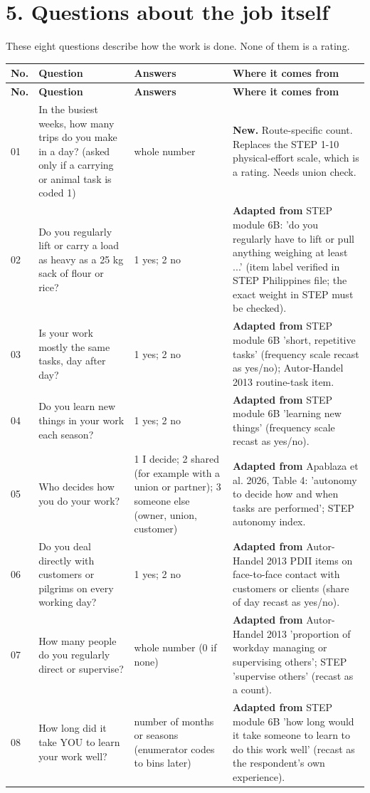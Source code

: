 \documentclass[11pt]{article}
\begin{document}
\section*{5. Questions about the job itself}
These eight questions describe how the work is done. None of them is a rating.
{\footnotesize
\begin{longtable}{p{0.7cm}p{4.5cm}p{3.0cm}p{6.4cm}}
\toprule
\textbf{No.} & \textbf{Question} & \textbf{Answers} & \textbf{Where it comes from} \\
\midrule
\endfirsthead
\toprule
\textbf{No.} & \textbf{Question} & \textbf{Answers} & \textbf{Where it comes from} \\
\midrule
\endhead
01 & In the busiest weeks, how many trips do you make in a day? (asked only if a carrying or animal task is coded 1) & whole number & \textbf{New.} Route-specific count. Replaces the STEP 1-10 physical-effort scale, which is a rating. Needs union check. \\
02 & Do you regularly lift or carry a load as heavy as a 25 kg sack of flour or rice? & 1 yes; 2 no & \textbf{Adapted from} STEP module 6B: 'do you regularly have to lift or pull anything weighing at least ...' (item label verified in STEP Philippines file; the exact weight in STEP must be checked). \\
03 & Is your work mostly the same tasks, day after day? & 1 yes; 2 no & \textbf{Adapted from} STEP module 6B 'short, repetitive tasks' (frequency scale recast as yes/no); Autor-Handel 2013 routine-task item. \\
04 & Do you learn new things in your work each season? & 1 yes; 2 no & \textbf{Adapted from} STEP module 6B 'learning new things' (frequency scale recast as yes/no). \\
05 & Who decides how you do your work? & 1 I decide; 2 shared (for example with a union or partner); 3 someone else (owner, union, customer) & \textbf{Adapted from} Apablaza et al. 2026, Table 4: 'autonomy to decide how and when tasks are performed'; STEP autonomy index. \\
06 & Do you deal directly with customers or pilgrims on every working day? & 1 yes; 2 no & \textbf{Adapted from} Autor-Handel 2013 PDII items on face-to-face contact with customers or clients (share of day recast as yes/no). \\
07 & How many people do you regularly direct or supervise? & whole number (0 if none) & \textbf{Adapted from} Autor-Handel 2013 'proportion of workday managing or supervising others'; STEP 'supervise others' (recast as a count). \\
08 & How long did it take YOU to learn your work well? & number of months or seasons (enumerator codes to bins later) & \textbf{Adapted from} STEP module 6B 'how long would it take someone to learn to do this work well' (recast as the respondent's own experience). \\
\bottomrule
\end{longtable}
}
\end{document}

